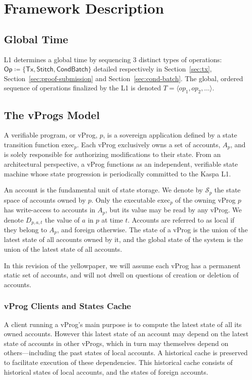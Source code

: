 \documentclass[onecolumn, 9pt, a4paper]{extarticle}
\begin{document}
\section{Framework Description}

\subsection{Global Time}
L1 determines a global time by sequencing 3 distinct types of operations: $\mathsf{Op}\coloneqq\{\textsf{Tx},\textsf{Stitch},\textsf{CondBatch}\}$ detailed respectively in Section~\ref{sec:tx}, Section~\ref{sec:proof-submission} and Section~\ref{sec:cond-batch}. The global, ordered sequence of operations finalized by the L1 is denoted $T = \langle op_1, op_2, \dots \rangle$. 

\subsection{The vProgs Model}
A verifiable program, or vProg, $p$, is a sovereign application defined by a state transition function $\mathrm{exec}_p$. Each
vProg exclusively owns a set of accounts, $A_p$, and is solely responsible for authorizing modifications to their
state. From an architectural perspective, a vProg functions as an independent, verifiable state machine whose state progression is periodically committed to the Kaspa L1.

An account is the fundamental unit of state storage. We denote by $\mathcal{S}_p$ the state space of accounts owned by $p$.
Only the executable $\mathrm{exec}_p$ of the owning vProg $p$ has write-access to accounts in $A_p$, but its value may be read by any vProg. We
denote $D_{p,a,t}$ the value of $a$ in $p$ at time $t$. Accounts are referred to as local if they belong to $A_p$, and foreign otherwise.
The state of a vProg is the union of the latest state of all accounts owned by it, and the global state of the system is the union of the latest state of all accounts.

In this revision of the yellowpaper, we will assume each vProg has a permanent static set of accounts,
and will not dwell on questions of creation or deletion of accounts.

\subsubsection{vProg Clients and States Cache}
A client running a vProg’s main purpose is to compute the latest state of all its owned accounts. However
this latest state of an account may depend on the latest state of accounts in other vProgs, which in turn may
themselves depend on others---including the past states of local accounts. A historical cache is preserved to
facilitate execution of these dependencies. This historical cache consists of historical states of local
accounts, and the states of foreign accounts. 
\end{document}
